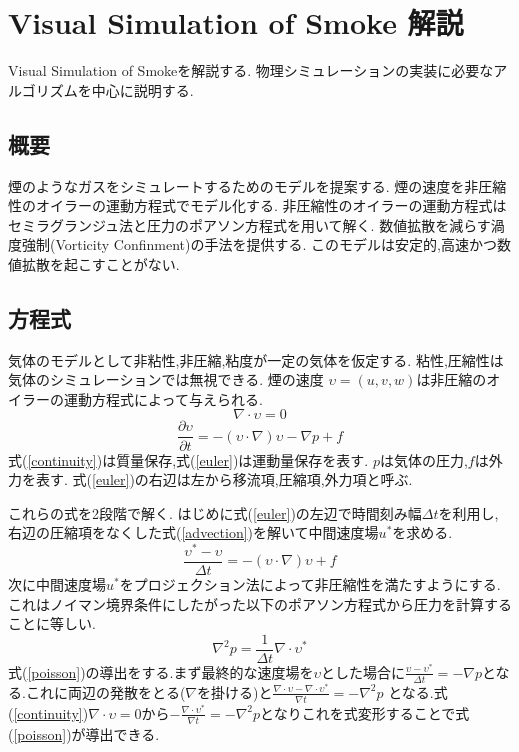 \section{Visual Simulation of Smoke 解説}
\label{smoke}
Visual Simulation of Smoke\cite{Fedkiw2001}を解説する.
物理シミュレーションの実装に必要なアルゴリズムを中心に説明する.
\subsection{概要}
煙のようなガスをシミュレートするためのモデルを提案する.
煙の速度を非圧縮性のオイラーの運動方程式でモデル化する.
非圧縮性のオイラーの運動方程式はセミラグランジュ法と圧力のポアソン方程式を用いて解く.
数値拡散を減らす渦度強制(Vorticity Confinment)の手法を提供する.
このモデルは安定的,高速かつ数値拡散を起こすことがない.
\subsection{方程式}
気体のモデルとして非粘性,非圧縮,粘度が一定の気体を仮定する.
粘性,圧縮性は気体のシミュレーションでは無視できる.
煙の速度 $\upsilon = (u,v,w)$は非圧縮のオイラーの運動方程式によって与えられる.
\begin{equation}
\label{continuity}
\nabla \cdot \upsilon = 0
\end{equation}
\begin{equation}
\label{euler}
\frac{\partial \upsilon}{\partial t} = -(\upsilon \cdot \nabla)\upsilon - \nabla p + f
\end{equation}
式(\ref{continuity})は質量保存,式(\ref{euler})は運動量保存を表す.
$p$は気体の圧力,$f$は外力を表す.
式(\ref{euler})の右辺は左から移流項,圧縮項,外力項と呼ぶ.

これらの式を2段階で解く.
はじめに式(\ref{euler})の左辺で時間刻み幅$\Delta t$を利用し,
右辺の圧縮項をなくした式(\ref{advection})を解いて中間速度場$u^*$を求める.
\begin{equation}
\label{advection}
\frac{\upsilon^* - \upsilon}{\Delta t} = -(\upsilon \cdot \nabla)\upsilon + f
\end{equation}
次に中間速度場$u^*$をプロジェクション法によって非圧縮性を満たすようにする.
これはノイマン境界条件にしたがった以下のポアソン方程式から圧力を計算することに等しい.
\begin{equation}
\label{poisson}
\nabla^2 p = \frac{1}{\Delta t} \nabla \cdot \upsilon^*
\end{equation}
式(\ref{poisson})の導出をする.まず最終的な速度場を$\upsilon$とした場合に$\frac{\upsilon - \upsilon^* }{\Delta t} = - \nabla p$となる.これに両辺の発散をとる($\nabla$を掛ける)と$\frac{\nabla \cdot \upsilon - \nabla \cdot \upsilon^*}{\nabla t} = - \nabla^2 p$ となる.式(\ref{continuity})$\nabla \cdot \upsilon = 0$から$- \frac{\nabla \cdot \upsilon^*}{\nabla t} = - \nabla^2 p$となりこれを式変形することで式(\ref{poisson})が導出できる.


